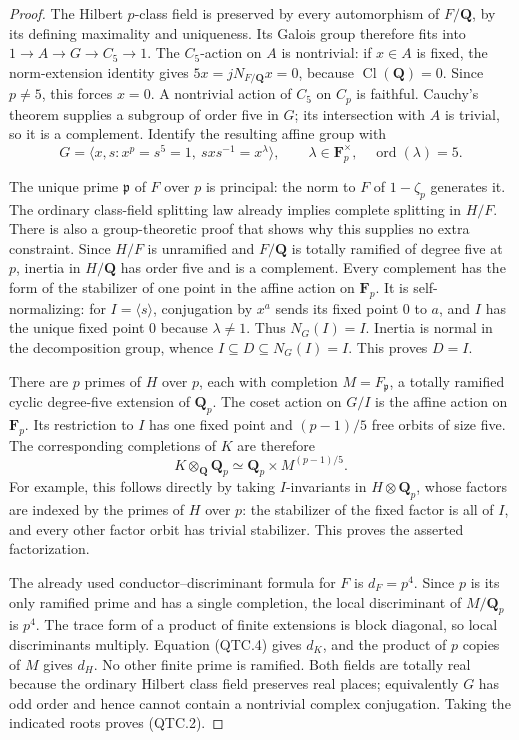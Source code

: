 \documentclass[11pt,a4paper]{article}
\theoremstyle{definition}
\begin{document}
\begin{proof}
The Hilbert $p$-class field is preserved by every automorphism of
$F/\mathbf Q$, by its defining maximality and uniqueness.  Its Galois
group therefore fits into $1\to A\to G\to C_5\to1$.
The $C_5$-action on $A$ is nontrivial: if $x\in A$ is fixed, the
norm-extension identity gives
$5x=jN_{F/\mathbf Q}x=0$, because $\operatorname{Cl}(\mathbf Q)=0$.
Since $p\ne5$, this forces $x=0$.  A nontrivial action of $C_5$ on
$C_p$ is faithful.  Cauchy's theorem supplies a subgroup of order
five in $G$; its intersection with $A$ is trivial, so it is a
complement.  Identify the resulting affine group with
\[
 G=\langle x,s:x^p=s^5=1,\ sxs^{-1}=x^\lambda\rangle,
 \qquad \lambda\in\mathbf F_p^\times,
 \quad\operatorname{ord}(\lambda)=5.                 \tag{QTC.3}
\]

The unique prime $\mathfrak p$ of $F$ over $p$ is principal:
the norm to $F$ of $1-\zeta_p$ generates it.  The ordinary class-field
splitting law already implies complete splitting in $H/F$.
There is also a group-theoretic proof that shows why this supplies
no extra constraint.  Since $H/F$ is unramified and $F/\mathbf Q$
is totally ramified of degree five at $p$, inertia in $H/\mathbf Q$
has order five and is a complement.  Every complement has the form
of the stabilizer of one point in the affine action on $\mathbf F_p$.
It is self-normalizing: for $I=\langle s\rangle$, conjugation by
$x^a$ sends its fixed point $0$ to $a$, and $I$ has the unique fixed
point $0$ because $\lambda\ne1$.  Thus $N_G(I)=I$.
Inertia is normal in the decomposition group, whence
$I\subseteq D\subseteq N_G(I)=I$.  This proves $D=I$.

There are $p$ primes of $H$ over $p$, each with completion
$M=F_{\mathfrak p}$, a totally ramified cyclic degree-five
extension of $\mathbf Q_p$.  The coset action on $G/I$ is the
affine action on $\mathbf F_p$.  Its restriction to $I$ has one
fixed point and $(p-1)/5$ free orbits of size five.  The corresponding
completions of $K$ are therefore
\[
 K\otimes_{\mathbf Q}\mathbf Q_p
       \simeq\mathbf Q_p\times M^{(p-1)/5}.           \tag{QTC.4}
\]
For example, this follows directly by taking $I$-invariants in
$H\otimes\mathbf Q_p$, whose factors are indexed by the primes
of $H$ over $p$: the stabilizer of the fixed factor is all of $I$,
and every other factor orbit has trivial stabilizer.
This proves the asserted factorization.

The already used conductor--discriminant formula for $F$ is
$d_F=p^4$.  Since $p$ is its only ramified prime and has a single
completion, the local discriminant of $M/\mathbf Q_p$ is $p^4$.
The trace form of a product of finite extensions is block diagonal,
so local discriminants multiply.  Equation (QTC.4) gives $d_K$,
and the product of $p$ copies of $M$ gives $d_H$.  No other finite
prime is ramified.  Both fields are totally real because the ordinary
Hilbert class field preserves real places; equivalently $G$ has odd
order and hence cannot contain a nontrivial complex conjugation.
Taking the indicated roots proves (QTC.2).


\end{proof}
\end{document}
